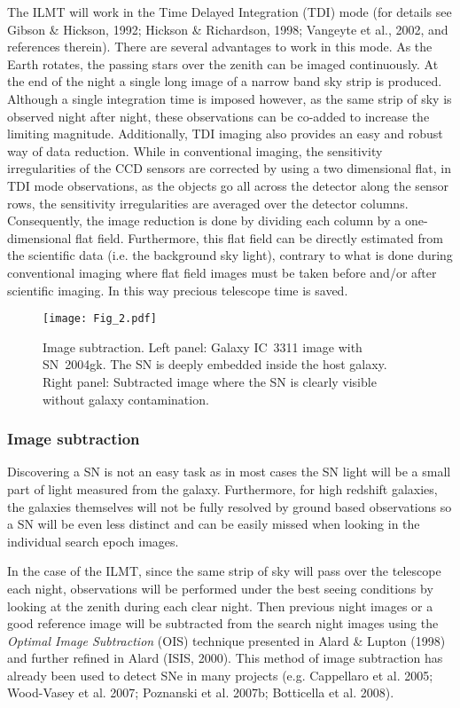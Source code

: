 \documentclass[12pt,a4paper]{article}
\begin{document}
The ILMT will work in the Time Delayed Integration (TDI) mode (for details see Gibson \& Hickson, 1992; 
Hickson \& Richardson, 1998; Vangeyte et al., 2002, and references therein). There are several 
advantages to work in this mode. As the Earth rotates, the passing stars over the zenith can be imaged 
continuously.  
At the end of the night a single long image of a narrow band sky strip is produced. Although a single 
integration time is imposed however, as the same strip of sky is observed night after night, these 
observations can be co-added to increase the limiting magnitude.
Additionally, TDI imaging also provides an easy and robust way of data reduction. While in conventional 
imaging, the sensitivity irregularities of the CCD sensors are corrected by using a two dimensional flat, 
in TDI mode observations, as the objects go all across the detector along the sensor rows, the sensitivity 
irregularities are averaged over the detector columns. Consequently, the image reduction is done by dividing 
each column by a one-dimensional flat field. Furthermore, this flat field can be directly 
estimated from the scientific data (i.e. the background sky light), contrary to what is done 
during conventional imaging where flat field images must be taken before and/or after 
scientific imaging. In this way precious telescope time is saved. 
%

\begin{figure*}
\centering
\texttt{[image: Fig\_2.pdf]}
\caption{Image subtraction. Left panel: Galaxy IC~3311 image with SN~2004gk.
The SN is deeply embedded inside the host galaxy. 
Right panel: Subtracted image where the SN is clearly visible without galaxy 
contamination.}
\label{ilmt_image}
\end{figure*}


\subsubsection{Image subtraction}

Discovering a SN is not an easy task as in most cases the SN light will be a small part 
of light measured from the galaxy. Furthermore, for high redshift galaxies, the galaxies 
themselves will not be fully resolved by ground based observations so a SN will be even 
less distinct and can be easily missed when looking in the individual search epoch images. 
 
In the case of the ILMT, since the same strip of sky will pass over the telescope 
each night, observations will be performed under the best seeing conditions by looking at 
the zenith during each clear night. Then previous night images or a good reference image 
will be subtracted from the 
search night images using the {\it Optimal Image Subtraction} (OIS) technique presented 
in Alard \& Lupton (1998) and further refined in Alard (ISIS, 2000).
This method of image subtraction has already been used to detect SNe in many projects
(e.g. Cappellaro et al. 2005; Wood-Vasey et al. 2007; Poznanski et al. 2007b; Botticella et al.
2008).
\end{document}

